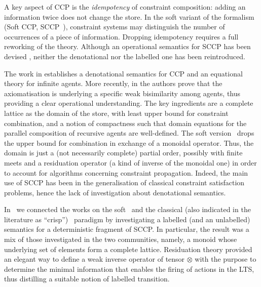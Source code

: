 \documentclass[submission,copyright,creativecommons]{eptcs}
\begin{document}
A key aspect of CCP is the \emph{idempotency} of constraint composition:
adding an information twice does not change the store. 
%
In the soft variant of the formalism (Soft CCP, SCCP~\cite{scc}),
constraint systems may distinguish the number of occurrences of a  
piece of information.
%
Dropping idempotency requires a full reworking of the theory. Although an operational semantics for SCCP has been devised \cite{scc},
neither the denotational nor the labelled one has been reintroduced. 




The work in \cite{popl91} establishes a denotational semantics
for CCP and an equational theory for infinite agents. More recently, in \cite{pippo} the authors
prove that the axiomatisation is underlying a specific weak bisimilarity among agents,
thus providing a clear operational understanding.
%
The key ingredients are a complete lattice as the domain of the store, with least upper bound for constraint
combination, and a notion of compactness such that domain equations for 
the parallel composition of 
recursive agents are well-defined.
%
The soft version~\cite{scc} drops the upper bound for combination
in exchange of a monoidal operator. Thus, the domain is just a (not
necessarily complete) partial order, possibly with finite meets and a residuation operator (a kind of
inverse of the monoidal one) in order to account for algorithms concerning constraint propagation.
%
Indeed, the main use of SCCP has been in the generalisation of classical constraint satisfaction
problems, hence 
the lack of investigation about denotational semantics.




In~\cite{coord} we connected the works on the soft~\cite{scc} and the classical 
(also indicated in the literature as ``crisp'')~\cite{pippo,popl91} 
paradigm by investigating
a labelled (and an unlabelled) semantics for a deterministic fragment of SCCP. In particular, the result 
was a mix of those investigated in the two communities, namely, a monoid whose underlying set of elements
form a complete lattice.  Residuation theory 
provided an elegant way to define a weak inverse operator of tensor $\otimes$ with the purpose to  determine the 
minimal information that enables the firing of actions in the LTS, thus distilling a suitable notion of labelled transition.
\end{document}
